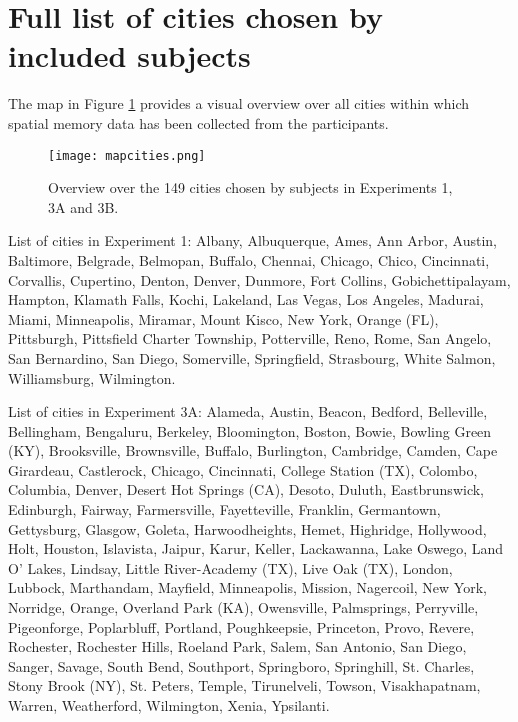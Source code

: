 \section{Full list of cities chosen by included subjects}

The map in Figure \ref{fig_map} provides a visual overview over all cities within which spatial memory data has been collected from the participants.

\begin{figure}[h]
	\centering
	\texttt{[image: mapcities.png]}
	\caption{Overview over the 149 cities chosen by subjects in Experiments 1, 3A and 3B.}
	\label{fig_map}
\end{figure}

List of cities in Experiment 1: \footnotesize{Albany, Albuquerque, Ames, Ann Arbor, Austin, Baltimore, Belgrade, Belmopan, Buffalo, Chennai, Chicago, Chico, Cincinnati, Corvallis, Cupertino, Denton, Denver, Dunmore, Fort Collins, Gobichettipalayam, Hampton, Klamath Falls, Kochi, Lakeland, Las Vegas, Los Angeles, Madurai, Miami, Minneapolis, Miramar, Mount Kisco, New York, Orange (FL), Pittsburgh, Pittsfield Charter Township, Potterville, Reno, Rome, San Angelo, San Bernardino, San Diego, Somerville, Springfield, Strasbourg, White Salmon, Williamsburg, Wilmington}.

\normalsize

List of cities in Experiment 3A: \footnotesize{Alameda, Austin, Beacon, Bedford, Belleville, Bellingham, Bengaluru, Berkeley, Bloomington, Boston, Bowie, Bowling Green (KY), Brooksville, Brownsville, Buffalo, Burlington, Cambridge, Camden, Cape Girardeau, Castlerock, Chicago, Cincinnati, College Station (TX), Colombo, Columbia, Denver, Desert Hot Springs (CA), Desoto, Duluth, Eastbrunswick, Edinburgh, Fairway, Farmersville, Fayetteville, Franklin, Germantown, Gettysburg, Glasgow, Goleta, Harwoodheights, Hemet, Highridge, Hollywood, Holt, Houston, Islavista, Jaipur, Karur, Keller, Lackawanna, Lake Oswego, Land O' Lakes, Lindsay, Little River-Academy (TX), Live Oak (TX), London, Lubbock, Marthandam, Mayfield, Minneapolis, Mission, Nagercoil, New York, Norridge, Orange, Overland Park (KA), Owensville, Palmsprings, Perryville, Pigeonforge, Poplarbluff, Portland, Poughkeepsie, Princeton, Provo, Revere, Rochester, Rochester Hills, Roeland Park, Salem, San Antonio, San Diego, Sanger, Savage, South Bend, Southport, Springboro, Springhill, St. Charles, Stony Brook (NY), St. Peters, Temple, Tirunelveli, Towson, Visakhapatnam, Warren, Weatherford, Wilmington, Xenia, Ypsilanti}.

